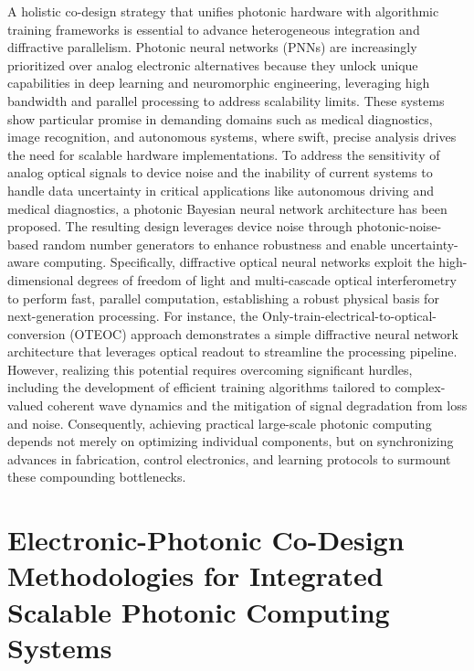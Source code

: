 \documentclass[11pt]{article}
\begin{document}
A holistic co-design strategy that unifies photonic hardware with algorithmic training frameworks is essential to advance heterogeneous integration and diffractive parallelism. Photonic neural networks (PNNs) are increasingly prioritized over analog electronic alternatives because they unlock unique capabilities in deep learning and neuromorphic engineering, leveraging high bandwidth and parallel processing to address scalability limits. These systems show particular promise in demanding domains such as medical diagnostics, image recognition, and autonomous systems, where swift, precise analysis drives the need for scalable hardware implementations. To address the sensitivity of analog optical signals to device noise and the inability of current systems to handle data uncertainty in critical applications like autonomous driving and medical diagnostics, a photonic Bayesian neural network architecture has been proposed. The resulting design leverages device noise through photonic-noise-based random number generators to enhance robustness and enable uncertainty-aware computing. \citep{doi_10_1002_advs_202500525_74e7146e} Specifically, diffractive optical neural networks exploit the high-dimensional degrees of freedom of light and multi-cascade optical interferometry to perform fast, parallel computation, establishing a robust physical basis for next-generation processing. For instance, the Only-train-electrical-to-optical-conversion (OTEOC) approach demonstrates a simple diffractive neural network architecture that leverages optical readout to streamline the processing pipeline. \citep{doi_10_1364_oe_462370_1269b480} However, realizing this potential requires overcoming significant hurdles, including the development of efficient training algorithms tailored to complex-valued coherent wave dynamics and the mitigation of signal degradation from loss and noise. Consequently, achieving practical large-scale photonic computing depends not merely on optimizing individual components, but on synchronizing advances in fabrication, control electronics, and learning protocols to surmount these compounding bottlenecks. \citep{doi_10_3390_nano14080697_c372a140} \citep{s2_b765388f3cc18d6e5a0507522822def0e3503ec6_fa09b483}

\section{Electronic-Photonic Co-Design Methodologies for Integrated Scalable Photonic Computing Systems}\label{electronic-photonic-co-design-methodologies-for-integrated-scalable-photonic-computing-systems}
\end{document}
